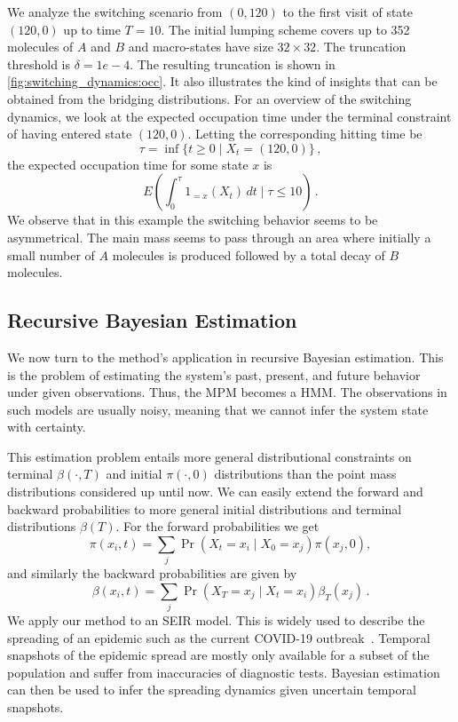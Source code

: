 We analyze the switching scenario from $(0, 120)$ to the first visit of state $(120, 0)$ up to time $T=10$. The initial lumping scheme covers up to 352 molecules of $A$ and $B$ and  macro-states have size $32\times32$.
The truncation threshold is $\delta=1e-4$.
The resulting truncation is shown in \autoref{fig:switching_dynamics:occ}.
It also illustrates the kind of insights that can be obtained from the bridging distributions.
For an overview of the switching dynamics, we look at the expected occupation time under the terminal constraint of having entered state $(120,0)$. Letting the corresponding hitting time be 
\[
	\tau=\inf\{t\geq 0\mid X_t=(120, 0)\}\,,
\]
the expected occupation time for some state $x$ is
\[
	E\left(\int_0^{\tau}1_{=x}(X_t)\,dt\mid \tau\leq 10\right)\,.
\]
We observe that in this example the switching  behavior seems to be asymmetrical.
The main mass seems to pass through an area where initially a small number of $A$ molecules is produced followed by a total decay of $B$ molecules.


\subsection{Recursive Bayesian Estimation}
We now turn to the method's application in recursive Bayesian estimation.
This is the problem of estimating the system's
past, present, and future behavior under given observations.
Thus, the \ac{MPM} becomes a \acf{HMM}.
The observations in such models are usually noisy, meaning that we cannot infer the system state with certainty.

This estimation problem entails more general distributional constraints on terminal $\beta(\cdot,T)$ and initial $\pi(\cdot, 0)$ distributions than the point mass distributions considered up until now.
We can easily extend the forward and backward probabilities to more general initial
distributions   and terminal distributions $\beta(T)$.
For the forward probabilities we get
\begin{equation}
    \pi(x_i, t) = \sum_j \Pr(X_t=x_i\mid X_0=x_j) \pi(x_j,0),
\end{equation}
and similarly the backward probabilities are given by
\begin{equation}
    \beta(x_i, t) = \sum_j\Pr(X_T=x_j\mid X_t = x_i) \beta_T(x_j)\,.
\end{equation}
We apply our method to an \acf{SEIR} model.
This is widely used to describe the spreading of an epidemic such as the current COVID-19 outbreak~\cite{he2020seir,grossmann2020importance}.
Temporal snapshots of the epidemic spread  are mostly only available for a subset of the population and suffer from   inaccuracies of diagnostic tests.
Bayesian estimation can then be used to infer the spreading dynamics given uncertain temporal snapshots.

